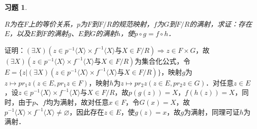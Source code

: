 \documentclass[12pt, a4paper, oneside]{book}
\newtheorem{exer}{习题}
\begin{document}
			\begin{exer}\label{exer74}
				\hfill\par
				$R$为在$F$上的等价关系，$p$为$F$到$F/R$的规范映射，$f$为$G$到$F/R$的满射，求证：存在$E$，以及$E$到$F$的满射$g$、$E$到$G$的满射$h$，使$p\circ g=f\circ h$．
			\end{exer}
			证明：$(\exists X)(z\in p^{-1}\langle X \rangle \times f^{-1}\langle X \rangle \text{与}X\in F/R)\Rightarrow z\in F\times G$，故$(\exists X)(z\in p^{-1}\langle X \rangle \times f^{-1}\langle X \rangle \text{与}X\in F/R)$为集合化公式，令$E=\{z|(\exists X)(z\in p^{-1}\langle X \rangle \times f^{-1}\langle X \rangle \text{与}X\in F/R)\}$，映射$g$为$z\mapsto pr_1z(z\in E, pr_1z\in F)$，映射$h$为$z\mapsto pr_2z(z\in E, pr_2z\in G)$．对任意$z\in E$，设$z\in p^{-1}\langle X \rangle \times f^{-1}\langle X \rangle \text{与}X\in F/R$，故$p(g(z))=X$，$f(h(z))=X$，同时，由于$p$、$f$均为满射，故对任意$x\in F$，令$G(x)=X$，故$p^{-1}\langle X \rangle \times f^{-1}\langle X \rangle \neq \varnothing$，因此存在$z\in E$，使$g(z)=x$，故$g$为满射，同理可证$h$为满射．			
			
\end{document}
